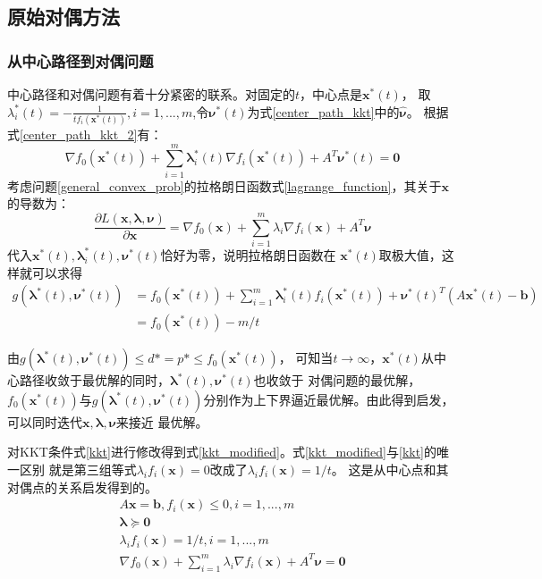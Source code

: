 \documentclass{article}
\begin{document}
\subsection{原始对偶方法}
\label{text_prim_dual}
\subsubsection{从中心路径到对偶问题}
\label{center_to_dual}
中心路径和对偶问题有着十分紧密的联系。对固定的$t$，中心点是$\bm x^*(t)$，
取$\lambda_i^*(t)=-\frac{1}{tf_i(\bm x^*(t))},i=1,...,m$,令$\bm \nu^*(t)$为式\eqref{center_path_kkt}中的$\widehat{\bm\nu}$。
根据式\eqref{center_path_kkt_2}有：
$$\nabla f_0(\bm x^*(t))+\sum\limits_{i=1}^m{\bm\lambda_i^*(t)\nabla f_i(\bm x^*(t))}+A^T\bm \nu^*(t)=\bm 0$$
考虑问题\ref{general_convex_prob}的拉格朗日函数式\eqref{lagrange_function}，其关于$\bm x$的导数为：
$$\frac{\partial L(\bm x,\bm \lambda,\bm \nu)}{\partial\bm x}=
\nabla f_0(\bm x)+\sum\limits_{i=1}^m{\lambda_i\nabla f_i(\bm x)}+A^T\bm\nu$$
代入$\bm x^*(t),\bm\lambda_i^*(t),\bm\nu^*(t)$恰好为零，说明拉格朗日函数在
$\bm x^*(t)$取极大值，这样就可以求得
\begin{equation}
    \label{dual_margin}
    \begin{aligned}
    g(\bm\lambda^*(t),\bm\nu^*(t))&=f_0(\bm x^*(t))+\sum_{i=1}^m{\bm\lambda_i^*(t)f_i(\bm x^*(t))}+\bm\nu^*(t)^T(A\bm x^*(t)-\bm b)\\
    &=f_0(\bm x^*(t))-m/t
    \end{aligned}
\end{equation}

由$g(\bm\lambda^*(t),\bm\nu^*(t))\le d*=p*\le f_0(\bm x^*(t))$，
可知当$t\rightarrow\infty$，$\bm x^*(t)$从中心路径收敛于最优解的同时，$\bm\lambda^*(t),\bm\nu^*(t)$也收敛于
对偶问题的最优解，$f_0(\bm x^*(t))$与$g(\bm\lambda^*(t),\bm\nu^*(t))$分别作为上下界逼近最优解。由此得到启发，可以同时迭代$\bm x,\bm\lambda,\bm\nu$来接近
最优解。

对KKT条件式\eqref{kkt}进行修改得到式\eqref{kkt_modified}。式\eqref{kkt_modified}与\eqref{kkt}的唯一区别
就是第三组等式$\lambda_if_i(\bm x)=0$改成了$\lambda_if_i(\bm x)=1/t$。
这是从中心点和其对偶点的关系启发得到的。
\begin{equation}
    \label{kkt_modified}
    \begin{gathered}
    A\bm x=\bm b,f_i(\bm x)\le 0,i=1,...,m \\
    \bm\lambda\succeq \bm 0 \\
    \lambda_if_i(\bm x)=1/t,i=1,...,m\\
    \nabla f_0(\bm x)+\sum\limits_{i=1}^m{\lambda_i}\nabla f_i(\bm x)+A^T\bm\nu=\bm 0\\
    \end{gathered}
\end{equation}
\end{document}
